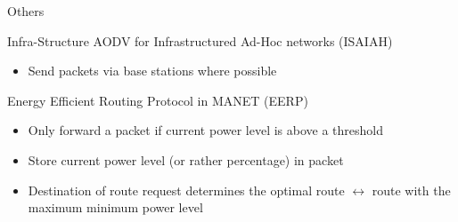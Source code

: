 \documentclass{beamer}
\begin{document}
\begin{frame}{Others}
\begin{block}{Infra-Structure AODV for Infrastructured Ad-Hoc networks (ISAIAH)\cite{lindgren2002infrastructured}}
\begin{itemize}
    \item Send packets via base stations where possible
\end{itemize}
\end{block}
\begin{block}{Energy Efficient Routing Protocol in MANET (EERP)\cite{main2}}
\begin{itemize}
    \item Only forward a packet if current power level is above a threshold
    \item Store current power level (or rather percentage) in packet
    \item Destination of route request determines the optimal route
        $\leftrightarrow$ route with the maximum minimum power level
\end{itemize}
\end{block}
\end{frame}
\end{document}
